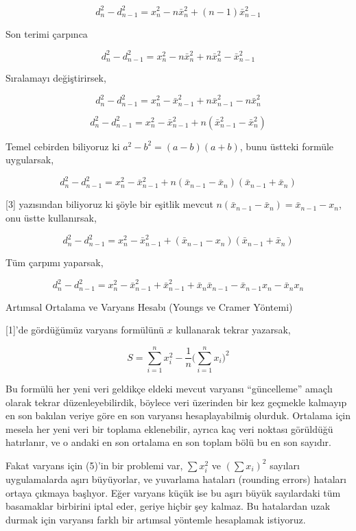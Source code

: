 \documentclass[12pt,fleqn]{article}\usepackage{../../common}
\begin{document}
$$
d_n^2 - d_{n-1}^2 = x_n^2 - n \bar{x}_n^2 + (n-1) \bar{x}_{n-1}^2
$$

Son terimi çarpınca

$$
d_n^2 - d_{n-1}^2 = x_n^2 - n \bar{x}_n^2 + n \bar{x}_n^2 - \bar{x}_{n-1}^2
$$

Sıralamayı değiştirirsek,

$$
d_n^2 - d_{n-1}^2 = x_n^2  - \bar{x}_{n-1}^2 + n \bar{x}_{n-1}^2 - n \bar{x}_n^2
$$

$$
d_n^2 - d_{n-1}^2 = x_n^2  - \bar{x}_{n-1}^2 + n (\bar{x}_{n-1}^2 - \bar{x}_n^2)
$$

Temel cebirden biliyoruz ki $a^2-b^2 = (a-b)(a+b)$, bunu üstteki formüle
uygularsak,

$$
d_n^2 - d_{n-1}^2 =
x_n^2  -
\bar{x}_{n-1}^2 +
n (\bar{x}_{n-1} - \bar{x}_n) (\bar{x}_{n-1} + \bar{x}_n) 
$$

[3] yazısından biliyoruz ki şöyle bir eşitlik mevcut $n (\bar{x}_{n-1} - \bar{x}_n) = \bar{x}_{n-1} - x_n $,
onu üstte kullanırsak,

$$
d_n^2 - d_{n-1}^2 = x_n^2  - \bar{x}_{n-1}^2 +  (\bar{x}_{n-1} - x_n) (\bar{x}_{n-1} + \bar{x}_n) 
$$

Tüm çarpımı yaparsak,

$$
d_n^2 - d_{n-1}^2 = x_n^2 - \bar{x}_{n-1}^2  + \bar{x}_{n-1}^2 +
\bar{x}_n \bar{x}_{n-1} - \bar{x}_{n-1} x_n - \bar{x}_n x_n
$$













Artımsal Ortalama ve Varyans Hesabı (Youngs ve Cramer Yöntemi)

[1]'de gördüğümüz varyans formülünü $x$ kullanarak tekrar yazarsak,

$$ 
S = \sum _{i=1}^{n} x_i^2 - \frac{1}{n} \bigg( \sum _{i=1}^{n} x_i \bigg)^2  
$$

Bu formülü her yeni veri geldikçe eldeki mevcut varyansı ``güncelleme''
amaçlı olarak tekrar düzenleyebilirdik, böylece veri üzerinden bir kez
geçmekle kalmayıp en son bakılan veriye göre en son varyansı
hesaplayabilmiş olurduk. Ortalama için mesela her yeni veri bir toplama
eklenebilir, ayrıca kaç veri noktası görüldüğü hatırlanır, ve o andaki en
son ortalama en son toplam bölü bu en son sayıdır. 

Fakat varyans için (5)'in bir problemi var, $\sum x_i^2$ ve $(\sum x_i)^2$
sayıları uygulamalarda aşırı büyüyorlar, ve yuvarlama hataları (rounding
errors) hataları ortaya çıkmaya başlıyor. Eğer varyans küçük ise bu aşırı
büyük sayılardaki tüm basamaklar birbirini iptal eder, geriye hiçbir şey
kalmaz. Bu hatalardan uzak durmak için varyansı farklı bir artımsal
yöntemle hesaplamak istiyoruz.
\end{document}

